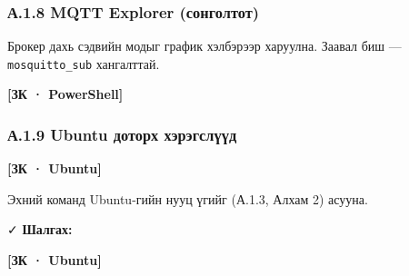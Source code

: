 \hypertarget{ux430.1.8-mqtt-explorer-ux441ux43eux43dux433ux43eux43bux442ux43eux442}{%
\subsubsection{А.1.8 MQTT Explorer (сонголтот)}\label{ux430.1.8-mqtt-explorer-ux441ux43eux43dux433ux43eux43bux442ux43eux442}}

Брокер дахь сэдвийн модыг график хэлбэрээр харуулна. Заавал биш --- \texttt{mosquitto\_sub} хангалттай.

\textbf{{[}ЗК · PowerShell{]}}

\begin{Shaded}
\begin{Highlighting}[]
\end{Highlighting}
\end{Shaded}

\hypertarget{ux430.1.9-ubuntu-ux434ux43eux442ux43eux440ux445-ux445ux44dux440ux44dux433ux441ux43bux4afux4afux434}{%
\subsubsection{А.1.9 Ubuntu доторх хэрэгслүүд}\label{ux430.1.9-ubuntu-ux434ux43eux442ux43eux440ux445-ux445ux44dux440ux44dux433ux441ux43bux4afux4afux434}}

\textbf{{[}ЗК · Ubuntu{]}}

\begin{Shaded}
\begin{Highlighting}[]
\end{Highlighting}
\end{Shaded}

Эхний команд Ubuntu-гийн нууц үгийг (А.1.3, Алхам 2) асууна.

✓ \textbf{Шалгах:}

\textbf{{[}ЗК · Ubuntu{]}}

\begin{Shaded}
\begin{Highlighting}[]
\KeywordTok{;} \KeywordTok{|} \KeywordTok{;} \KeywordTok{;} \KeywordTok{|} 
\end{Highlighting}
\end{Shaded}

